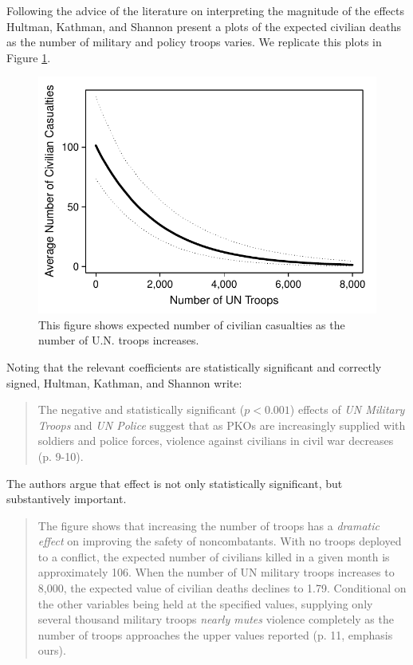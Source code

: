 \documentclass[12pt]{article}
\begin{document}
Following the advice of the literature on interpreting the magnitude of the effects Hultman, Kathman, and Shannon present a plots of the expected civilian deaths as the number of military and policy troops varies. We replicate this plots in Figure \ref{fig:hks-ev}.

\begin{figure}[H]
\begin{center}
\includegraphics[scale = .8]{figs/hks-ev.pdf}
\caption{This figure shows expected number of civilian casualties as the number of U.N. troops increases.}\label{fig:hks-ev}
\end{center}
\end{figure}

Noting that the relevant coefficients are statistically significant and correctly signed, Hultman, Kathman, and Shannon write:

\begin{quote}
The negative and statistically significant ($p < 0.001$) effects of \textit{UN Military Troops} and \textit{UN Police} suggest that as PKOs are increasingly supplied with soldiers and police forces, violence against civilians in civil war decreases (p. 9-10).
\end{quote}

The authors argue that effect is not only statistically significant, but substantively important.

\begin{quote}
The figure shows that increasing the number of troops has a \emph{dramatic effect} on improving the safety of noncombatants. With no troops deployed to a conflict, the expected number of civilians killed in a given month is approximately 106. When the number of UN military troops increases to 8,000, the expected value of civilian deaths declines to 1.79. Conditional on the other variables being held at the specified values, supplying only several thousand military troops \emph{nearly mutes} violence completely as the number of troops approaches the upper values reported (p. 11, emphasis ours).
\end{quote}
\end{document}
